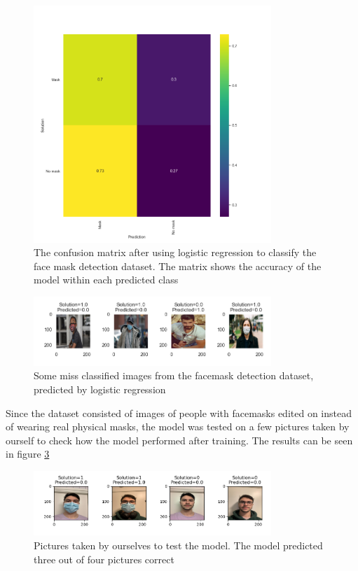 \documentclass[../main.tex]{subfiles}
\begin{document}
\begin{figure}[H]
    \centering
    \includegraphics[width=0.8\textwidth]{doc/assets/logreg_mask_heatmap_accuracy48_original_testset.png}
    \caption{The confusion matrix after using logistic regression to classify the face mask detection dataset. The matrix shows the accuracy of the model within each predicted class}
    \label{fig:logreg_facemask_cm}
\end{figure}

\begin{figure}[H]
    \centering
    \includegraphics[width=0.8\textwidth]{doc/assets/logreg_missclassified_facemask.png}
    \caption{Some miss classified images from the facemask detection dataset, predicted by logistic regression}
    \label{fig:missclassified_logreg_facemask}
\end{figure}


Since the dataset consisted of images of people with facemasks edited on instead of wearing real physical masks, the model was tested on a few pictures taken by ourself to check how the model performed after training. The results can be seen in figure \ref{fig:logreg_real_pics}

\begin{figure}[H]
    \centering
    \includegraphics[width=0.8\textwidth]{doc/assets/log_reg_real_pics.png}
    \caption{Pictures taken by ourselves to test the model. The model predicted three out of four pictures correct}
    \label{fig:logreg_real_pics}
\end{figure}
\end{document}
